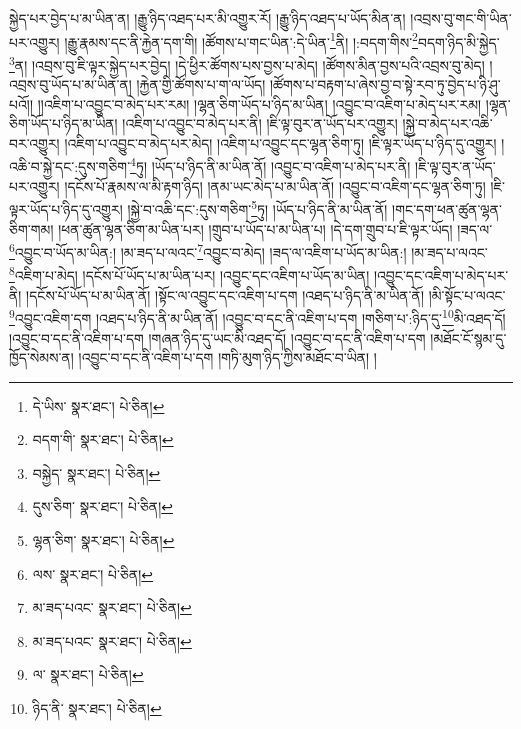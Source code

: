 སྐྱེད་པར་བྱེད་པ་མ་ཡིན་ན། །རྒྱུ་ཉིད་འཐད་པར་མི་འགྱུར་རོ། །རྒྱུ་ཉིད་འཐད་པ་ཡོད་མིན་ན། །འབྲས་བུ་གང་གི་ཡིན་པར་འགྱུར། །རྒྱུ་རྣམས་དང་ནི་རྐྱེན་དག་གི། །ཚོགས་པ་གང་ཡིན་:དེ་ཡིན་\footnote{དེ་ཡིས་  སྣར་ཐང་།  པེ་ཅིན། }ནི། །:བདག་གིས་\footnote{བདག་གི་  སྣར་ཐང་།  པེ་ཅིན། }བདག་ཉིད་མི་སྐྱེད་\footnote{བསྐྱེད་  སྣར་ཐང་།  པེ་ཅིན། }ན། །འབྲས་བུ་ཇི་ལྟར་སྐྱེད་པར་བྱེད། །དེ་ཕྱིར་ཚོགས་པས་བྱས་པ་མེད། །ཚོགས་མིན་བྱས་པའི་འབྲས་བུ་མེད། །འབྲས་བུ་ཡོད་པ་མ་ཡིན་ན། །རྐྱེན་གྱི་ཚོགས་པ་ག་ལ་ཡོད། །ཚོགས་པ་བརྟག་པ་ཞེས་བྱ་བ་སྟེ་རབ་ཏུ་བྱེད་པ་ཉི་ཤུ་པའོ།། །།འཇིག་པ་འབྱུང་བ་མེད་པར་རམ། །ལྷན་ཅིག་ཡོད་པ་ཉིད་མ་ཡིན། །འབྱུང་བ་འཇིག་པ་མེད་པར་རམ། །ལྷན་ཅིག་ཡོད་པ་ཉིད་མ་ཡིན། །འཇིག་པ་འབྱུང་བ་མེད་པར་ནི། །ཇི་ལྟ་བུར་ན་ཡོད་པར་འགྱུར། །སྐྱེ་བ་མེད་པར་འཆི་བར་འགྱུར། །འཇིག་པ་འབྱུང་བ་མེད་པར་མེད། །འཇིག་པ་འབྱུང་དང་ལྷན་ཅིག་ཏུ། །ཇི་ལྟར་ཡོད་པ་ཉིད་དུ་འགྱུར། །འཆི་བ་སྐྱེ་དང་:དུས་གཅིག་\footnote{དུས་ཅིག་  སྣར་ཐང་།  པེ་ཅིན། }ཏུ། །ཡོད་པ་ཉིད་ནི་མ་ཡིན་ནོ། །འབྱུང་བ་འཇིག་པ་མེད་པར་ནི། །ཇི་ལྟ་བུར་ན་ཡོད་པར་འགྱུར། །དངོས་པོ་རྣམས་ལ་མི་རྟག་ཉིད། །ནམ་ཡང་མེད་པ་མ་ཡིན་ནོ། །འབྱུང་བ་འཇིག་དང་ལྷན་ཅིག་ཏུ། །ཇི་ལྟར་ཡོད་པ་ཉིད་དུ་འགྱུར། །སྐྱེ་བ་འཆི་དང་:དུས་གཅིག་\footnote{ལྷན་ཅིག་  སྣར་ཐང་།  པེ་ཅིན། }ཏུ། །ཡོད་པ་ཉིད་ནི་མ་ཡིན་ནོ། །གང་དག་ཕན་ཚུན་ལྷན་ཅིག་གམ། །ཕན་ཚུན་ལྷན་ཅིག་མ་ཡིན་པར། །གྲུབ་པ་ཡོད་པ་མ་ཡིན་པ། །དེ་དག་གྲུབ་པ་ཇི་ལྟར་ཡོད། །ཟད་ལ་\footnote{ལས་  སྣར་ཐང་།  པེ་ཅིན། }འབྱུང་བ་ཡོད་མ་ཡིན:། །མ་ཟད་པ་ལའང་\footnote{མ་ཟད་པའང་  སྣར་ཐང་།  པེ་ཅིན། }འབྱུང་བ་མེད། །ཟད་ལ་འཇིག་པ་ཡོད་མ་ཡིན:། །མ་ཟད་པ་ལའང་\footnote{མ་ཟད་པའང་  སྣར་ཐང་།  པེ་ཅིན། }འཇིག་པ་མེད། །དངོས་པོ་ཡོད་པ་མ་ཡིན་པར། །འབྱུང་དང་འཇིག་པ་ཡོད་མ་ཡིན། །འབྱུང་དང་འཇིག་པ་མེད་པར་ནི། །དངོས་པོ་ཡོད་པ་མ་ཡིན་ནོ། །སྟོང་ལ་འབྱུང་དང་འཇིག་པ་དག །འཐད་པ་ཉིད་ནི་མ་ཡིན་ནོ། །མི་སྟོང་པ་ལའང་\footnote{ལ་  སྣར་ཐང་།  པེ་ཅིན། }འབྱུང་འཇིག་དག །འཐད་པ་ཉིད་ནི་མ་ཡིན་ནོ། །འབྱུང་བ་དང་ནི་འཇིག་པ་དག །གཅིག་པ་:ཉིད་དུ་\footnote{ཉིད་ནི་  སྣར་ཐང་།  པེ་ཅིན། }མི་འཐད་དོ། །འབྱུང་བ་དང་ནི་འཇིག་པ་དག །གཞན་ཉིད་དུ་ཡང་མི་འཐད་དོ། །འབྱུང་བ་དང་ནི་འཇིག་པ་དག །མཐོང་ངོ་སྙམ་དུ་ཁྱོད་སེམས་ན། །འབྱུང་བ་དང་ནི་འཇིག་པ་དག །གཏི་མུག་ཉིད་ཀྱིས་མཐོང་བ་ཡིན། །
